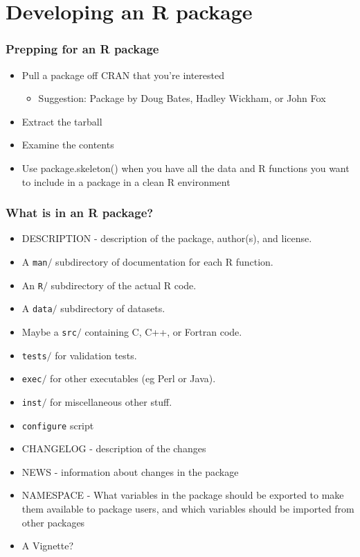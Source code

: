 \documentclass[xcolor=svgnames]{beamer}
\begin{document}
\section{Developing an R package}

\begin{frame}
\frametitle{Prepping for an R package}
\begin{itemize}
  \item Pull a package off CRAN that you're interested
    \begin{itemize}
      \item Suggestion: Package by Doug Bates, Hadley Wickham, or John Fox
    \end{itemize}
  \item Extract the tarball
  \item Examine the contents
  \item Use package.skeleton() when you have all the data and R functions you want to include in a package in a clean R environment
    \end{itemize}
\end{frame}


\begin{frame}[fragile]
\frametitle{What is in an R package?}
\begin{itemize}
\item DESCRIPTION - description of the package, author(s), and license.
\item A \texttt{man$/$} subdirectory of documentation for each R function.
\item An  \texttt{R$/$} subdirectory of the actual R code.
\item A \texttt{data$/$} subdirectory of datasets.
\item Maybe a \texttt{src$/$} containing C, C++, or Fortran code.
\item \texttt{tests$/$} for validation tests.
\item \texttt{exec$/$} for other executables (eg Perl or Java).
\item \texttt{inst$/$} for miscellaneous other stuff.
\item \texttt{configure} script
\item CHANGELOG - description of the changes
\item NEWS - information about changes in the package
\item NAMESPACE -  What variables in the package should be exported to make them available to package users, and which variables should be imported from other packages
\item A Vignette?
\end{itemize}
\end{frame}
\end{document}
